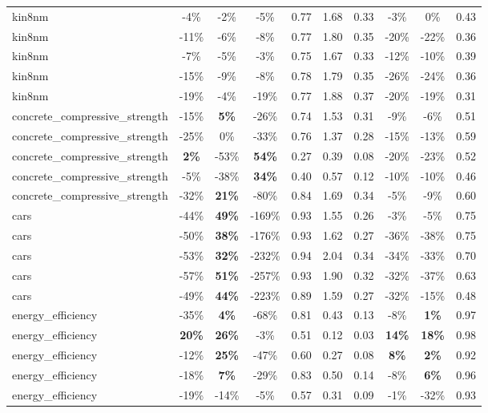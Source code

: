 \begin{table}[!htbp]
\begin{small}
\begin{sc}
{\begin{tabular}{lccccccccc}
kin8nm & -4\% & -2\% & -5\% & 0.77 & 1.68 & 0.33 & -3\% & 0\% & 0.43 \\
kin8nm & -11\% & -6\% & -8\% & 0.77 & 1.80 & 0.35 & -20\% & -22\% & 0.36 \\
kin8nm & -7\% & -5\% & -3\% & 0.75 & 1.67 & 0.33 & -12\% & -10\% & 0.39 \\
kin8nm & -15\% & -9\% & -8\% & 0.78 & 1.79 & 0.35 & -26\% & -24\% & 0.36 \\
kin8nm & -19\% & -4\% & -19\% & 0.77 & 1.88 & 0.37 & -20\% & -19\% & 0.31 \\
concrete\_compressive\_strength & -15\% & \textbf{5\%} & -26\% & 0.74 & 1.53 & 0.31 & -9\% & -6\% & 0.51 \\
concrete\_compressive\_strength & -25\% & 0\% & -33\% & 0.76 & 1.37 & 0.28 & -15\% & -13\% & 0.59 \\
concrete\_compressive\_strength & \textbf{2\%} & -53\% & \textbf{54\%} & 0.27 & 0.39 & 0.08 & -20\% & -23\% & 0.52 \\
concrete\_compressive\_strength & -5\% & -38\% & \textbf{34\%} & 0.40 & 0.57 & 0.12 & -10\% & -10\% & 0.46 \\
concrete\_compressive\_strength & -32\% & \textbf{21\%} & -80\% & 0.84 & 1.69 & 0.34 & -5\% & -9\% & 0.60 \\
cars & -44\% & \textbf{49\%} & -169\% & 0.93 & 1.55 & 0.26 & -3\% & -5\% & 0.75 \\
cars & -50\% & \textbf{38\%} & -176\% & 0.93 & 1.62 & 0.27 & -36\% & -38\% & 0.75 \\
cars & -53\% & \textbf{32\%} & -232\% & 0.94 & 2.04 & 0.34 & -34\% & -33\% & 0.70 \\
cars & -57\% & \textbf{51\%} & -257\% & 0.93 & 1.90 & 0.32 & -32\% & -37\% & 0.63 \\
cars & -49\% & \textbf{44\%} & -223\% & 0.89 & 1.59 & 0.27 & -32\% & -15\% & 0.48 \\
energy\_efficiency & -35\% & \textbf{4\%} & -68\% & 0.81 & 0.43 & 0.13 & -8\% & \textbf{1\%} & 0.97 \\
energy\_efficiency & \textbf{20\%} & \textbf{26\%} & -3\% & 0.51 & 0.12 & 0.03 & \textbf{14\%} & \textbf{18\%} & 0.98 \\
energy\_efficiency & -12\% & \textbf{25\%} & -47\% & 0.60 & 0.27 & 0.08 & \textbf{8\%} & \textbf{2\%} & 0.92 \\
energy\_efficiency & -18\% & \textbf{7\%} & -29\% & 0.83 & 0.50 & 0.14 & -8\% & \textbf{6\%} & 0.96 \\
energy\_efficiency & -19\% & -14\% & -5\% & 0.57 & 0.31 & 0.09 & -1\% & -32\% & 0.93 \\

\end{tabular}}
\end{sc}
\end{small}
\end{table}
